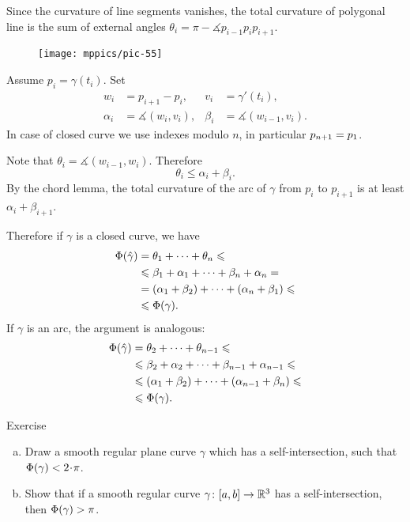 Since the curvature of line segments vanishes, 
the total curvature of polygonal line is the sum of external angles $\theta_i=\pi-\measuredangle p_{i-1}p_ip_{i+1}$.

\begin{wrapfigure}{o}{40 mm}
\vskip-0mm
\centering
\texttt{[image: mppics/pic-55]}
\vskip0mm
\end{wrapfigure}

Assume $p_i=\gamma(t_i)$.
Set 
\begin{align*}
w_i&=p_{i+1}-p_i,& v_i&=\gamma'(t_i),
\\
\alpha_i&=\measuredangle (w_i,v_i),&\beta_i&=\measuredangle (w_{i-1},v_i).
\end{align*}
In case of closed curve we use indexes modulo $n$, in particular $p_{n+1}\z=p_1$.

Note that $\theta_i=\measuredangle (w_{i-1},w_i)$.
Therefore 
\[\theta_i\le \alpha_i+\beta_i.\]
By the chord lemma, the total curvature of the arc of $\gamma$ from $p_i$ to $p_{i+1}$ is at least $\alpha_i+\beta_{i+1}$. 

Therefore if $\gamma$ is a closed curve, we have
\begin{align*}
\Phi({\hat\gamma})&=\theta_1+\dots+\theta_n\leqslant 
\\
&\leqslant\beta_1+\alpha_1+\dots+\beta_n+\alpha_n = 
\\
&=(\alpha_1+\beta_2)+\dots+(\alpha_n+\beta_1) \leqslant 
\\
&\leqslant \Phi({\gamma}).
\end{align*}
If $\gamma$ is an arc, the argument is analogous:
\begin{align*}
\Phi({\hat\gamma})&=\theta_2+\dots+\theta_{n-1}\leqslant 
\\
&\leqslant\beta_2+\alpha_2+\dots+\beta_{n-1}+\alpha_{n-1} \leqslant
\\
&\leqslant (\alpha_1+\beta_2)+\dots+(\alpha_{n-1}+\beta_n) \leqslant 
\\
&\leqslant \Phi({\gamma}).
\end{align*}
\qedsf

\begin{thm}{Exercise}\label{ex:sef-intersection}
\begin{enumerate}[(a)]
\item Draw a smooth regular plane curve $\gamma$ which has a self-intersection, such that $\tc\gamma<2\cdot\pi$.
\item\label{ex:sef-intersection:>pi} Show that if a smooth regular curve $\gamma\colon[a,b]\to\mathbb{R}^3$ has a self-intersection, then $\Phi({\gamma})>\pi$.
\end{enumerate}
\end{thm}

